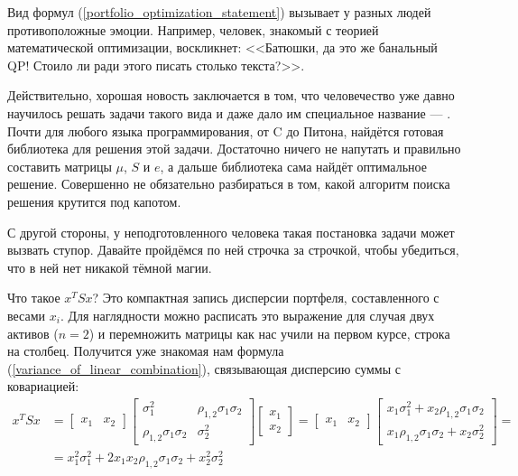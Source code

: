 Вид формул (\ref{portfolio_optimization_statement}) вызывает у разных людей 
противоположные эмоции. Например, человек, знакомый с теорией математической 
оптимизации, воскликнет: <<Батюшки, да это же банальный QP! Стоило ли ради этого 
писать столько текста?>>.

Действительно, хорошая новость заключается в том, что человечество уже давно 
научилось решать задачи такого вида и даже дало им специальное название --- 
 \cite[ch.~7--8]
{cornuejols2006optimization}. Почти для любого языка программирования, от C до 
Питона, найдётся готовая библиотека для решения этой задачи. Достаточно ничего 
не напутать и правильно составить матрицы $\mu$, $S$ и $e$, а дальше библиотека 
сама найдёт оптимальное решение. Совершенно не обязательно разбираться в том, 
какой алгоритм поиска решения крутится под капотом.

С другой стороны, у неподготовленного человека такая постановка задачи может 
вызвать ступор. Давайте пройдёмся по ней строчка за строчкой, чтобы убедиться, 
что в ней нет никакой тёмной магии.

Что такое $x^TSx$? Это компактная запись дисперсии портфеля, составленного с 
весами $x_i$. Для наглядности можно расписать это выражение для случая двух 
активов ($n=2$) и перемножить матрицы как нас учили на первом курсе, строка на 
столбец. Получится уже знакомая нам формула 
(\ref{variance_of_linear_combination}), связывающая дисперсию суммы с 
ковариацией:
\begin{align*}
x^TSx &= 
\begin{bmatrix}x_1 & x_2\end{bmatrix}
\begin{bmatrix}
\sigma_1^2 & \rho_{1,2}\sigma_1\sigma_2 \\
\rho_{1,2}\sigma_1\sigma_2 & \sigma_2^2
\end{bmatrix}
\begin{bmatrix}
x_1 \\
x_2
\end{bmatrix}
=
\begin{bmatrix}x_1 & x_2\end{bmatrix}
\begin{bmatrix}
x_1\sigma_1^2 + x_2\rho_{1,2}\sigma_1\sigma_2 \\
x_1\rho_{1,2}\sigma_1\sigma_2 + x_2\sigma_2^2
\end{bmatrix} = \\
&= 
x_1^2\sigma_1^2 + 2x_1x_2\rho_{1,2}\sigma_1\sigma_2 + x_2^2\sigma_2^2
\end{align*}

